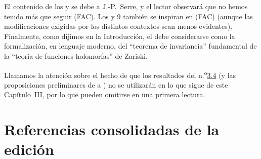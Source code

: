 El contenido de los \hyperref[section:III.1]{} y \hyperref[section:III.2]{} se debe a J.-P.~Serre, y el lector observará que no hemos tenido más que seguir (FAC).
Los  y 9 también se inspiran en (FAC) (aunque las modificaciones exigidas por los distintos contextos sean menos evidentes).
Finalmente, como dijimos en la Introducción, el \hyperref[section:III.4]{} debe considerarse como la formalización, en lenguaje moderno, del ``teorema de invariancia'' fundamental de la ``teoría de funciones holomorfas'' de Zariski.

Llamamos la atención sobre el hecho de que los resultados del n.\textsuperscript{o}\hyperref[subsection:III.3.4]{3.4} (y las proposiciones preliminares de  a ) no se utilizarán en lo que sigue de este \hyperref[section:ega3]{Capítulo~III}, por lo que pueden omitirse en una primera lectura.
\bigskip







\clearpage
{}
{}
\section*{Referencias consolidadas de la edición}
\nocite{*}




